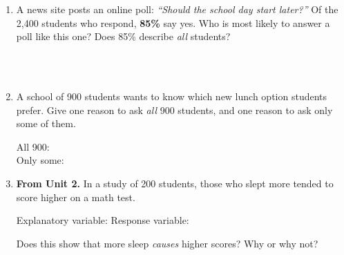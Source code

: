 \documentclass[12pt]{article}
\begin{document}

\vspace{0.28in}

\begin{enumerate}[leftmargin=1.9em, itemsep=0.42in]

  \item A news site posts an online poll: \emph{``Should the school day start later?''} Of the
        2{,}400 students who respond, \textbf{85\%} say yes. Who is most likely to answer a poll
        like this one? Does 85\% describe \emph{all} students?

        \vspace{12pt}
        \writeline\\[18pt]\writeline\\[18pt]\writeline

  \item A school of 900 students wants to know which new lunch option students prefer. Give one
        reason to ask \emph{all} 900 students, and one reason to ask only some of them.

        \vspace{12pt}
        All 900: \writeline\\[18pt]
        Only some: \writeline

  \item \textbf{From Unit 2.} In a study of 200 students, those who slept more tended to score
        higher on a math test.

        \vspace{12pt}
        Explanatory variable: \blank{3.2cm} \qquad Response variable: \blank{3.2cm}
        \vspace{16pt}

        Does this show that more sleep \emph{causes} higher scores? Why or why not?
        \vspace{12pt}

        \writeline\\[18pt]\writeline

\end{enumerate}
\end{document}
